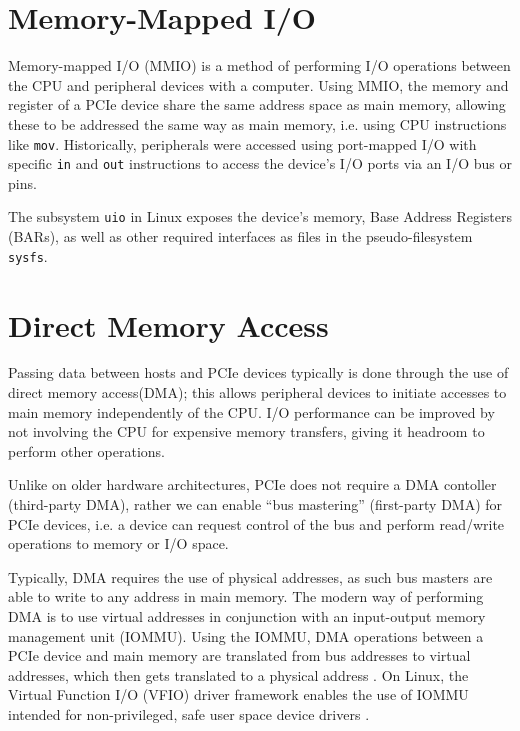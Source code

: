 

\section{Memory-Mapped I/O}
Memory-mapped I/O (MMIO) is a method of performing I/O operations between the CPU and peripheral devices with a computer. Using MMIO, the memory and register of a PCIe device share the same address space as main memory, allowing these to be addressed the same way as main memory, i.e. using CPU instructions like \texttt{mov}. Historically, peripherals were accessed using port-mapped I/O with specific \texttt{in} and \texttt{out} instructions to access the device's I/O ports via an I/O bus or pins.

The subsystem \texttt{uio} in Linux exposes the device's memory, Base Address Registers (BARs), as well as other required interfaces as files in the pseudo-filesystem \texttt{sysfs}.

\section{Direct Memory Access}
Passing data between hosts and PCIe devices typically is done through the use of direct memory access(DMA); this allows peripheral devices to initiate accesses to main memory independently of the CPU. I/O performance can be improved by not involving the CPU for expensive memory transfers, giving it headroom to perform other operations.

Unlike on older hardware architectures, PCIe does not require a DMA contoller (third-party DMA), rather we can enable ``bus mastering'' (first-party DMA) for PCIe devices, i.e. a device can request control of the bus and perform read/write operations to memory or I/O space.

Typically, DMA requires the use of physical addresses, as such bus masters are able to write to any address in main memory. The modern way of performing DMA is to use virtual addresses in conjunction with an input-output memory management unit (IOMMU). Using the IOMMU, DMA operations between a PCIe device and main memory are translated from bus addresses to virtual addresses, which then gets translated to a physical address \cite{spdk-dma}. On Linux, the Virtual Function I/O (VFIO) driver framework enables the use of IOMMU intended for non-privileged, safe user space device drivers \cite{vfio}.


